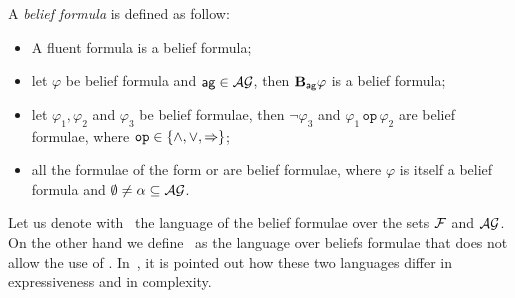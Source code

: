 \begin{definition} \label{def:belief_formula}
  A \emph{belief formula} is defined as follow:
  \begin{itemize}
  \item A fluent formula is a belief formula;
  \item let $\varphi$ be belief formula and $\agent{ag} \in \sAG$, then  $\bB{ag}{\varphi}$ is a belief
  formula;
  \item let $\varphi_1, \varphi_2$ and $\varphi_3$ be belief formulae,
  then $\neg \varphi_3$ and $\varphi_1 \,\mathtt{op}\, \varphi_2$ are belief
  formulae, where $\mathtt{op} \in \{\wedge,\vee, \Rightarrow\}$;
  \item all the formulae of the form \eAlpha{\varphi} or \cAlpha{\varphi}
  are belief formulae, where $\varphi$ is itself a belief formula and
  $\emptyset \neq \alpha \subseteq \mathcal{AG}$.
  \end{itemize}
\end{definition}
Let us denote with \lagC\ the language of the belief formulae over the
sets $\mathcal{F}$ and $\mathcal{AG}$.
On the other hand we define \lag\ as the language over beliefs formulae that
does not allow the use of   \C.
In~\cite{fagin1994reasoning}, it is pointed out how these two languages differ
in expressiveness and in complexity.
%

